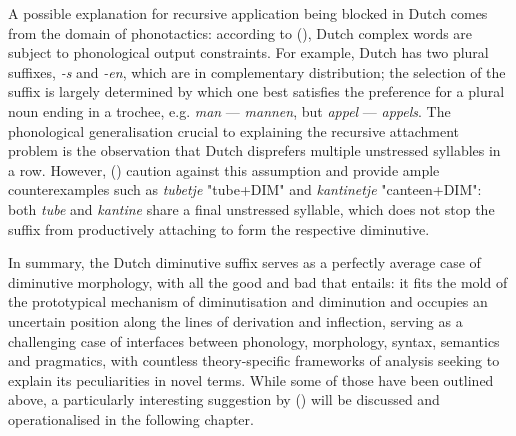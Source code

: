 A possible explanation for recursive application being blocked in Dutch comes from the domain of phonotactics: according to \citeauthor{Booij+1998} (\citeyear{Booij+1998}), Dutch complex words are subject to phonological output constraints. For example, Dutch has two plural suffixes, \textit{-s} and \textit{-en}, which are in complementary distribution; the selection of the suffix is largely determined by which one best satisfies the preference for a plural noun ending in a trochee, e.g. \textit{man} --- \textit{mannen}, but \textit{appel} --- \textit{appels}. The phonological generalisation crucial to explaining the recursive attachment problem is the observation that Dutch disprefers multiple unstressed syllables in a row. However, \citeauthor{taalportaal} (\citeyear{taalportaal}) caution against this assumption and provide ample counterexamples such as \textit{tubetje} "tube+DIM" and \textit{kantinetje} "canteen+DIM": both \textit{tube} and \textit{kantine} share a final unstressed syllable, which does not stop the suffix from productively attaching to form the respective diminutive.

In summary, the Dutch diminutive suffix serves as a perfectly average case of diminutive morphology, with all the good and bad that entails: it fits the mold of the prototypical mechanism of diminutisation and diminution and occupies an uncertain position along the lines of derivation and inflection, serving as a challenging case of interfaces between phonology, morphology, syntax, semantics and pragmatics, with countless theory-specific frameworks of analysis seeking to explain its peculiarities in novel terms. While some of those have been outlined above, a particularly interesting suggestion by \citeauthor{DeBelder+etal+2014} (\citeyear{DeBelder+etal+2014}) will be discussed and operationalised in the following chapter.